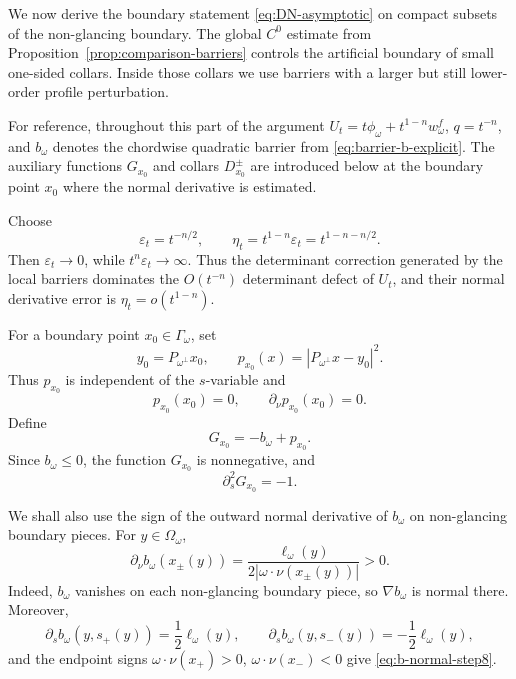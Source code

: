 \documentclass[11pt]{article}
\numberwithin{equation}{section}
\begin{document}
We now derive the boundary statement \eqref{eq:DN-asymptotic} on compact subsets of the non-glancing boundary.  The global \(C^0\) estimate from Proposition~\ref{prop:comparison-barriers} controls the artificial boundary of small one-sided collars.  Inside those collars we use barriers with a larger but still lower-order profile perturbation.

For reference, throughout this part of the argument \(U_t=t\phi_\omega+t^{1-n}w_\omega^f\), \(q=t^{-n}\), and \(b_\omega\) denotes the chordwise quadratic barrier from \eqref{eq:barrier-b-explicit}.  The auxiliary functions \(G_{x_0}\) and collars \(D_{x_0}^\pm\) are introduced below at the boundary point \(x_0\) where the normal derivative is estimated.

Choose
\[
    \varepsilon_t=t^{-n/2},
    \qquad
    \eta_t=t^{1-n}\varepsilon_t=t^{1-n-n/2}.
\]
Then \(\varepsilon_t\to0\), while \(t^n\varepsilon_t\to\infty\).  Thus the determinant correction generated by the local barriers dominates the \(O(t^{-n})\) determinant defect of \(U_t\), and their normal derivative error is \(\eta_t=o(t^{1-n})\).

For a boundary point \(x_0\in\Gamma_\omega\), set
\begin{equation}\label{eq:p-x0-def}
    y_0=P_{\omega^\perp}x_0,
    \qquad
    p_{x_0}(x)=|P_{\omega^\perp}x-y_0|^2.
\end{equation}
Thus \(p_{x_0}\) is independent of the \(s\)-variable and
\begin{equation}\label{eq:p-x0-normal-zero}
    p_{x_0}(x_0)=0,
    \qquad
    \partial_\nu p_{x_0}(x_0)=0.
\end{equation}
Define
\begin{equation}\label{eq:G-x0-def}
    G_{x_0}= -b_\omega+p_{x_0}.
\end{equation}
Since \(b_\omega\le0\), the function \(G_{x_0}\) is nonnegative, and
\begin{equation}\label{eq:G-ss}
    \partial_s^2G_{x_0}=-1.
\end{equation}

We shall also use the sign of the outward normal derivative of \(b_\omega\) on non-glancing boundary pieces.  For \(y\in\Omega_\omega\),
\begin{equation}\label{eq:b-normal-step8}
    \partial_\nu b_\omega(x_\pm(y))
    =
    \frac{\ell_\omega(y)}{2|\omega\cdot\nu(x_\pm(y))|}
    >0.
\end{equation}
Indeed, \(b_\omega\) vanishes on each non-glancing boundary piece, so \(\nabla b_\omega\) is normal there.  Moreover,
\[
    \partial_s b_\omega(y,s_+(y))=\frac12\ell_\omega(y),
    \qquad
    \partial_s b_\omega(y,s_-(y))=-\frac12\ell_\omega(y),
\]
and the endpoint signs \(\omega\cdot\nu(x_+)>0\), \(\omega\cdot\nu(x_-)<0\) give \eqref{eq:b-normal-step8}.
\end{document}
